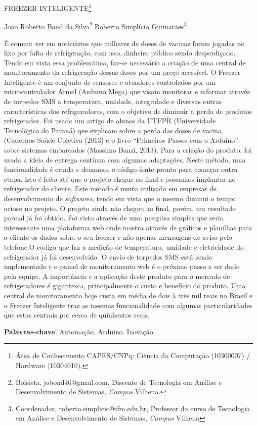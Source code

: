 \documentclass[article,12pt,onesidea,4paper,english,brazil]{abntex2}
\begin{document}
	
	
	\frenchspacing 
	
	\begin{center}
		\LARGE FREEZER INTELIGENTE\footnote{Área de Conhecimento CAPES/CNPq: Ciência da Computação (10300007) / Hardware (10304010).}
		
		\normalsize
		João Roberto Bond da Silva\footnote{Bolsista, jobond46@gmail.com, Discente de Tecnologia em Análise e Desenvolvimento de Sistemas, \textit{Campus} Vilhena.} 
		Roberto Simplício Guimarães\footnote{Coordenador, roberto.simplicio@ifro.edu.br, Professor do curso de Tecnologia em Análise e Desenvolvimento de Sistemas, \textit{Campus} Vilhena}
	\end{center}
	
	\noindent É comum ver em noticiários que milhares de doses de vacinas foram jogadas no lixo
	por falta de refrigeração, com isso, dinheiro público sendo desperdiçado. Tendo em
	vista essa problemática, faz-se necessário a criação de uma central de
	monitoramento da refrigeração dessas doses por um preço acessível. O Freezer
	Inteligente é um conjunto de sensores e atuadores controlados por um
	microcontrolador Atmel (Arduino Mega) que visam monitorar e informar através de
	torpedos SMS a temperatura, umidade, integridade e diversas outras características
	dos refrigeradores, com o objetivo de diminuir a perda de produtos refrigerados. Foi
	usado um artigo de alunos da UTFPR (Universidade Tecnológica do Paraná) que
	explicam sobre a perda das doses de vacina (Cadernos Saúde Coletiva (2013) e o
	livro “Primeiros Passos com o Arduino” sobre sistemas embarcados (Massimo Banzi,
	2013). Para a criação do produto, foi usada a ideia de entrega contínua com
	algumas adaptações. Neste método, uma funcionalidade é criada e deixamos o
	código-fonte pronto para começar outra etapa. Isto é feito até que o projeto chegue
	ao final e possamos implantar no refrigerador do cliente. Este método é muito
	utilizado em empresas de desenvolvimento de \textit{softwares}, tendo em vista que o
	mesmo diminui o tempo ocioso no projeto. O projeto ainda não chegou ao final,
	porém, um resultado parcial já foi obtido. Foi visto através de uma pesquisa simples
	que seria interessante uma plataforma web onde mostra através de gráficos e
	planilhas para o cliente os dados sobre o seu freezer e não apenas mensagens de
	aviso pelo telefone.O código que faz a medição de temperatura, umidade e
	eletricidade do refrigerador já foi desenvolvido. O envio de torpedos SMS está sendo
	implementado e o painel de monitoramento web é o próximo passo a ser dado pela
	equipe. A importância e a aplicação deste produto para o mercado de refrigeradores
	é gigantesca, principalmente o custo e benefício do produto. Uma central de
	monitoramento hoje custa em média de dois à três mil reais no Brasil e o Freezer
	Inteligente traz as mesmas funcionalidade com algumas particularidades que estas
	centrais por cerca de quinhentos reais.
	
	\vspace{\onelineskip}
	
	\noindent
	\textbf{Palavras-chave}: Automação. Arduino. Inovação.
	
\end{document}
